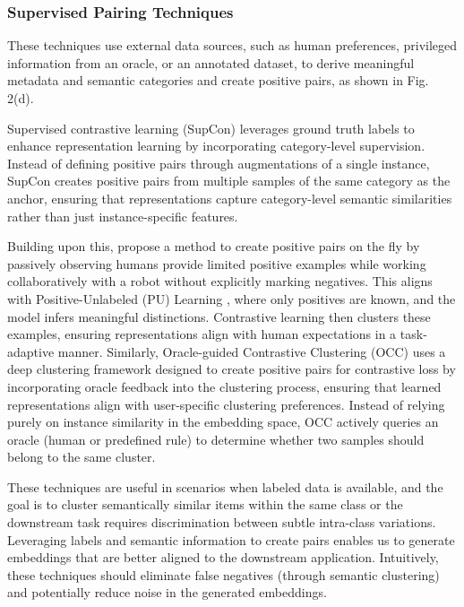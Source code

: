 \subsubsection{Supervised Pairing Techniques}

These techniques use external data sources, such as human preferences, privileged information from an oracle, or an annotated dataset, to derive meaningful metadata and semantic categories and create positive pairs, as shown in Fig. 2(d).


Supervised contrastive learning (SupCon) \cite{khosla2020supervised} leverages ground truth labels to enhance representation learning by incorporating category-level supervision. Instead of defining positive pairs through augmentations of a single instance, SupCon creates positive pairs from multiple samples of the same category as the anchor, ensuring that representations capture category-level semantic similarities rather than just instance-specific features.

Building upon this, \cite{ghose2023tailoring} propose a method to create positive pairs on the fly by passively observing humans provide limited positive examples while working collaboratively with a robot without explicitly marking negatives. This aligns with Positive-Unlabeled (PU) Learning \cite{bekker2020learning}, where only positives are known, and the model infers meaningful distinctions. Contrastive learning then clusters these examples, ensuring representations align with human expectations in a task-adaptive manner.
Similarly, Oracle-guided Contrastive Clustering (OCC) \cite{wang2022oracle} uses a deep clustering framework designed to create positive pairs for contrastive loss by incorporating oracle feedback into the clustering process, ensuring that learned representations align with user-specific clustering preferences. Instead of relying purely on instance similarity in the embedding space, OCC actively queries an oracle (human or predefined rule) to determine whether two samples should belong to the same cluster.

These techniques are useful in scenarios when labeled data is available, and the goal is to cluster semantically similar items within the same class or the downstream task requires discrimination between subtle intra-class variations. Leveraging labels and semantic information to create pairs enables us to generate embeddings that are better aligned to the downstream application. Intuitively, these techniques should eliminate false negatives (through semantic clustering) and potentially reduce noise in the generated embeddings. 

